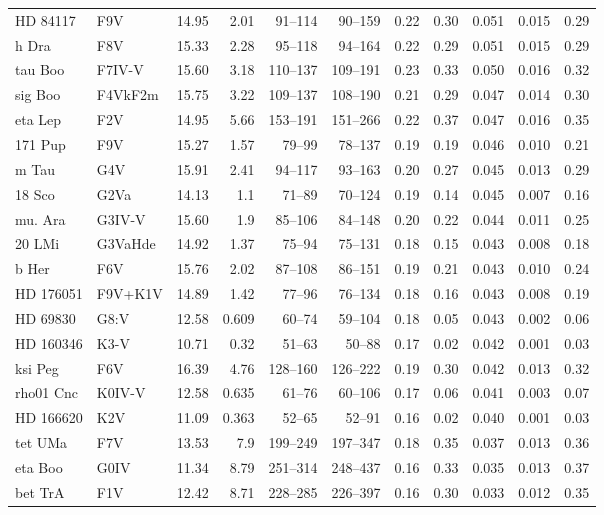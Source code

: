 \documentclass[11pt,a4paper]{article}
\begin{document}
{\begin{longtable}{llrrrrrrrrr}
HD  84117 & F9V & 14.95 & 2.01 & 91--114 & 90--159 & 0.22 & 0.30 & 0.051 & 0.015 & 0.29 \\
h Dra & F8V & 15.33 & 2.28 & 95--118 & 94--164 & 0.22 & 0.29 & 0.051 & 0.015 & 0.29 \\
tau Boo & F7IV-V & 15.60 & 3.18 & 110--137 & 109--191 & 0.23 & 0.33 & 0.050 & 0.016 & 0.32 \\
sig Boo & F4VkF2m & 15.75 & 3.22 & 109--137 & 108--190 & 0.21 & 0.29 & 0.047 & 0.014 & 0.30 \\
eta Lep & F2V & 14.95 & 5.66 & 153--191 & 151--266 & 0.22 & 0.37 & 0.047 & 0.016 & 0.35 \\
171 Pup & F9V & 15.27 & 1.57 & 79--99 & 78--137 & 0.19 & 0.19 & 0.046 & 0.010 & 0.21 \\
m Tau & G4V & 15.91 & 2.41 & 94--117 & 93--163 & 0.20 & 0.27 & 0.045 & 0.013 & 0.29 \\
18 Sco & G2Va & 14.13 & 1.1 & 71--89 & 70--124 & 0.19 & 0.14 & 0.045 & 0.007 & 0.16 \\
mu. Ara & G3IV-V & 15.60 & 1.9 & 85--106 & 84--148 & 0.20 & 0.22 & 0.044 & 0.011 & 0.25 \\
20 LMi & G3VaHde & 14.92 & 1.37 & 75--94 & 75--131 & 0.18 & 0.15 & 0.043 & 0.008 & 0.18 \\
b Her & F6V & 15.76 & 2.02 & 87--108 & 86--151 & 0.19 & 0.21 & 0.043 & 0.010 & 0.24 \\
HD 176051 & F9V+K1V & 14.89 & 1.42 & 77--96 & 76--134 & 0.18 & 0.16 & 0.043 & 0.008 & 0.19 \\
HD  69830 & G8:V & 12.58 & 0.609 & 60--74 & 59--104 & 0.18 & 0.05 & 0.043 & 0.002 & 0.06 \\
HD 160346 & K3-V & 10.71 & 0.32 & 51--63 & 50--88 & 0.17 & 0.02 & 0.042 & 0.001 & 0.03 \\
ksi Peg & F6V & 16.39 & 4.76 & 128--160 & 126--222 & 0.19 & 0.30 & 0.042 & 0.013 & 0.32 \\
rho01 Cnc & K0IV-V & 12.58 & 0.635 & 61--76 & 60--106 & 0.17 & 0.06 & 0.041 & 0.003 & 0.07 \\
HD 166620 & K2V & 11.09 & 0.363 & 52--65 & 52--91 & 0.16 & 0.02 & 0.040 & 0.001 & 0.03 \\
tet UMa & F7V & 13.53 & 7.9 & 199--249 & 197--347 & 0.18 & 0.35 & 0.037 & 0.013 & 0.36 \\
eta Boo & G0IV & 11.34 & 8.79 & 251--314 & 248--437 & 0.16 & 0.33 & 0.035 & 0.013 & 0.37 \\
bet TrA & F1V & 12.42 & 8.71 & 228--285 & 226--397 & 0.16 & 0.30 & 0.033 & 0.012 & 0.35 \\

\end{longtable}}
\end{document}
